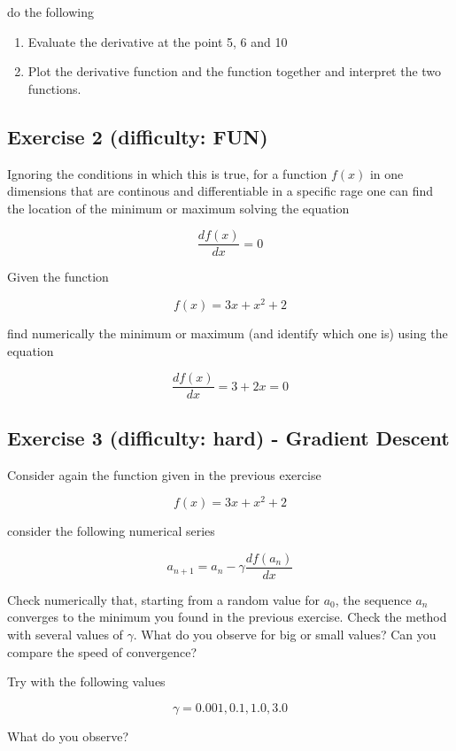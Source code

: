 \documentclass[11pt]{article}
\providecommand{\tightlist}{%
      \setlength{\itemsep}{0pt}\setlength{\parskip}{0pt}}
\begin{document}
do the following

\begin{enumerate}
\def\labelenumi{\arabic{enumi}.}
\tightlist
\item
  Evaluate the derivative at the point 5, 6 and 10
\item
  Plot the derivative function and the function together and interpret
  the two functions.
\end{enumerate}

    \subsection{Exercise 2 (difficulty:
FUN)}\label{exercise-2-difficulty-fun}

    Ignoring the conditions in which this is true, for a function \(f(x)\)
in one dimensions that are continous and differentiable in a specific
rage one can find the location of the minimum or maximum solving the
equation

\[
\frac{df(x)}{dx} = 0
\]

Given the function

\[
f(x) = 3x+x^2+2
\]

find numerically the minimum or maximum (and identify which one is)
using the equation

\[
\frac{df(x)}{dx} = 3+2x = 0
\]

    \subsection{Exercise 3 (difficulty: hard) - Gradient
Descent}\label{exercise-3-difficulty-hard---gradient-descent}

    Consider again the function given in the previous exercise

\[
f(x) = 3x+x^2+2
\]

consider the following numerical series

\[
a_{n+1} = a_n - \gamma \frac{df(a_n)}{dx}
\]

Check numerically that, starting from a random value for \(a_0\), the
sequence \(a_n\) converges to the minimum you found in the previous
exercise. Check the method with several values of \(\gamma\). What do
you observe for big or small values? Can you compare the speed of
convergence?

Try with the following values

\[\gamma = 0.001, 0.1, 1.0, 3.0\]

What do you observe?
\end{document}

